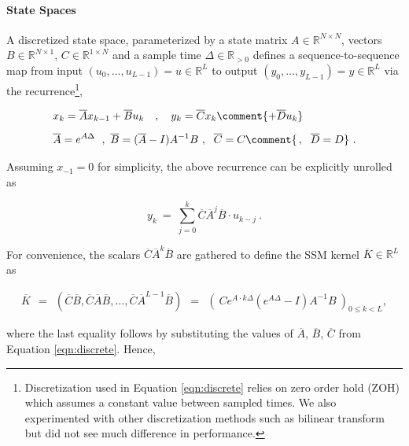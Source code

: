 \paragraph{State Spaces} A discretized state space, parameterized by a state matrix $A \in \mathbb{R}^{N \times N}$, vectors $B \in \mathbb{R}^{N \times 1}$, $C \in \mathbb{R}^{1 \times N}$ and a sample time $\Delta \in \mathbb{R}_{> 0}$ defines a sequence-to-sequence map from input $(u_0,\ldots,u_{L-1}) = u \in \mathbb{R}^L$ to output $(y_0,\ldots,y_{L-1}) = y \in \mathbb{R}^L$ via the recurrence\footnote{Discretization used in Equation \ref{eqn:discrete} relies on zero order hold (ZOH) which assumes a constant value between sampled times. We also experimented with other discretization methods such as bilinear transform but did not see much difference in performance.},

\begin{equation}\label{eqn:discrete}
\begin{split}
&x_k = \overline{A}x_{k-1} + \overline{B}u_k\ \ \ ,\ \ \ y_k = \overline{C}x_k \comment{ + \overline{D}u_k}\\[5pt]
&\overline{A} = e^{A\Delta}\ \;,\ \overline{B} = (\overline{A} - I)A^{-1}B\ ,\ \;\overline{C} = C\comment{\,,\ \;\overline{D} = D}\ .
\end{split}
\end{equation}

Assuming $x_{-1} = 0$ for simplicity, the above recurrence can be explicitly unrolled as

\begin{equation}\label{eqn:unroll}
y_k \ = \ \sum_{j=0}^k \overline{C}\overline{A}^j\overline{B}\cdot u_{k-j}\ .
\end{equation}

 
For convenience, the scalars $\overline{C}\overline{A}^k\overline{B}$ are gathered to define the SSM kernel $\overline{K} \in \mathbb{R}^L$ as

\begin{equation}\label{eqn:kernel}
\begin{split}
\overline{K} \ \ = \ \ (\overline{C}\overline{B}, \overline{C}\overline{A}\overline{B}, \ldots, \overline{C}\overline{A}^{L-1}\overline{B}) \ \ =\ \ (\ C e^{A\cdot k\Delta} (e^{A\Delta} - I)A^{-1}B\ )_{0 \leq k < L},
\end{split}
\end{equation}

where the last equality follows by substituting the values of $\overline{A}$, $\overline{B}$, $\overline{C}$ from Equation \ref{eqn:discrete}. Hence,

